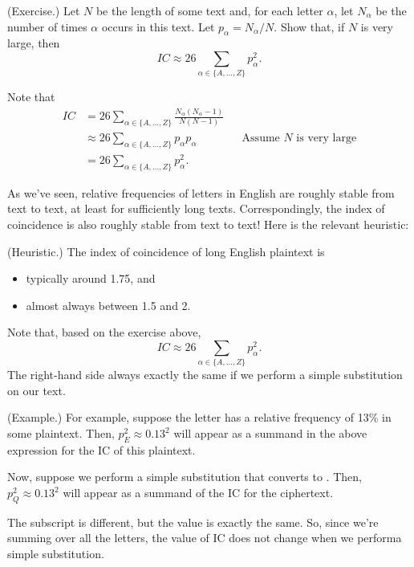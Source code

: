 \documentclass[letterpaper]{article}
\begin{document}
\begin{mdframed}
    (Exercise.) Let $N$ be the length of some text and, for each letter $\alpha$, let $N_\alpha$ be the number of times $\alpha$ occurs in this text. Let $p_\alpha = N_\alpha / N$. Show that, if $N$ is very large, then 
    \[IC \approx 26 \sum_{\alpha \in \{A, \hdots, Z\}} p_\alpha^2.\]

    \begin{mdframed}
        Note that 
        \begin{equation*}
            \begin{aligned}
                IC &= 26 \sum_{\alpha \in \{A, \hdots, Z\}} \frac{N_\alpha (N_\alpha - 1)}{N(N - 1)} \\
                    &\approx 26 \sum_{\alpha \in \{A, \hdots, Z\}} p_{\alpha} p_{\alpha} && \text{Assume } N \text{ is very large} \\ 
                    &= 26 \sum_{\alpha \in \{A, \hdots, Z\}} p_\alpha^2.
            \end{aligned}
        \end{equation*}
    \end{mdframed}
\end{mdframed}

As we've seen, relative frequencies of letters in English are roughly stable from text to text, at least for sufficiently long texts. Correspondingly, the index of coincidence is also roughly stable from text to text! Here is the relevant heuristic:

\begin{mdframed}
    (Heuristic.) The index of coincidence of long English plaintext is 
    \begin{itemize}
        \item typically around 1.75, and 
        \item almost always between 1.5 and 2. 
    \end{itemize}
\end{mdframed}

Note that, based on the exercise above,
\[IC \approx 26 \sum_{\alpha \in \{A, \hdots, Z\}} p_\alpha^2.\]
The right-hand side always exactly the same if we perform a simple substitution on our text. 
\begin{mdframed}
    (Example.) For example, suppose the letter  has a relative frequency of 13\% in some plaintext. Then, $p_E^2 \approx 0.13^2$ will appear as a summand in the above expression for the IC of this plaintext. 

    \bigskip 

    Now, suppose we perform a simple substitution that converts  to . Then, $p_Q^2 \approx 0.13^2$ will appear as a summand of the IC for the ciphertext.
\end{mdframed} 
The subscript is different, but the value is exactly the same. So, since we're summing over all the letters, the value of IC does not change when we performa  simple substitution.
\end{document}
